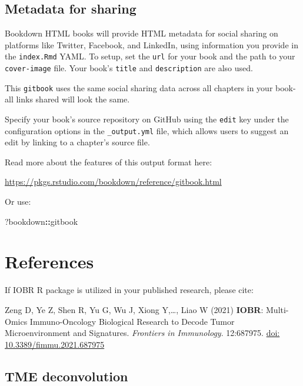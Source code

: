 \documentclass[
  12pt,
]{book}
\newenvironment{Shaded}{\begin{snugshade}}{\end{snugshade}}
\newcommand{\NormalTok}[1]{#1}
\newcommand{\SpecialCharTok}[1]{\textcolor[rgb]{0.81,0.36,0.00}{\textbf{#1}}}
\theoremstyle{definition}
\theoremstyle{definition}
\theoremstyle{definition}
\theoremstyle{definition}
\theoremstyle{remark}
\begin{document}
\hypertarget{metadata-for-sharing}{%
\section{Metadata for sharing}\label{metadata-for-sharing}}

Bookdown HTML books will provide HTML metadata for social sharing on platforms like Twitter, Facebook, and LinkedIn, using information you provide in the \texttt{index.Rmd} YAML. To setup, set the \texttt{url} for your book and the path to your \texttt{cover-image} file. Your book's \texttt{title} and \texttt{description} are also used.

This \texttt{gitbook} uses the same social sharing data across all chapters in your book- all links shared will look the same.

Specify your book's source repository on GitHub using the \texttt{edit} key under the configuration options in the \texttt{\_output.yml} file, which allows users to suggest an edit by linking to a chapter's source file.

Read more about the features of this output format here:

\url{https://pkgs.rstudio.com/bookdown/reference/gitbook.html}

Or use:

\begin{Shaded}
\begin{Highlighting}[]
\NormalTok{?bookdown}\SpecialCharTok{::}\NormalTok{gitbook}
\end{Highlighting}
\end{Shaded}

\hypertarget{references-1}{%
\chapter{\texorpdfstring{\textbf{References}}{References}}\label{references-1}}

If IOBR R package is utilized in your published research, please cite:

Zeng D, Ye Z, Shen R, Yu G, Wu J, Xiong Y,\ldots, Liao W (2021) \textbf{IOBR}: Multi-Omics Immuno-Oncology Biological Research to Decode Tumor Microenvironment and Signatures. \emph{Frontiers in Immunology}. 12:687975. \href{https://www.frontiersin.org/articles/10.3389/fimmu.2021.687975/full}{doi: 10.3389/fimmu.2021.687975}

\hypertarget{tme-deconvolution-1}{%
\section{TME deconvolution}\label{tme-deconvolution-1}}
\end{document}

